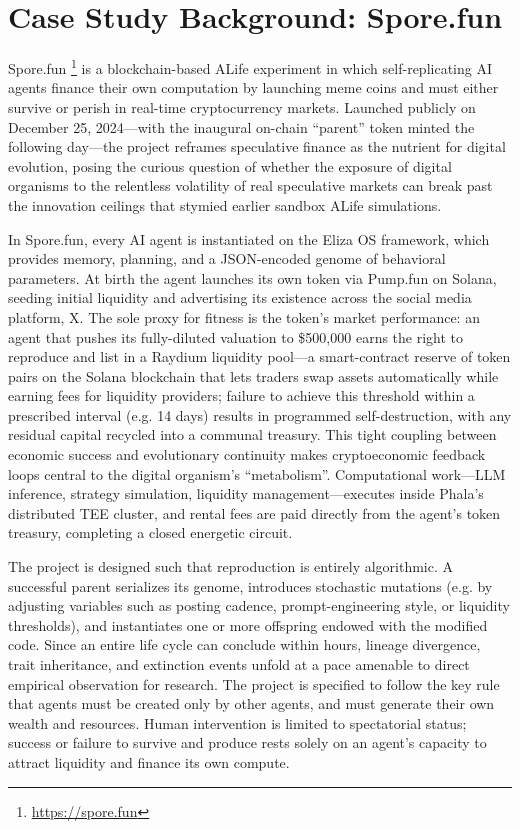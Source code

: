\section{Case Study Background: Spore.fun}
Spore.fun \footnote{\url{https://spore.fun}} is a blockchain-based ALife experiment in which self-replicating AI agents finance their own computation by launching meme coins and must either survive or perish in real-time cryptocurrency markets. Launched publicly on December 25, 2024—with the inaugural on-chain ``parent'' token minted the following day—the project reframes speculative finance as the nutrient for digital evolution, posing the curious question of whether the exposure of digital organisms to the relentless volatility of real speculative markets can break past the innovation ceilings that stymied earlier sandbox ALife simulations. 

In Spore.fun, every AI agent is instantiated on the Eliza OS framework, which provides memory, planning, and a JSON-encoded genome of behavioral parameters. At birth the agent launches its own token via Pump.fun on Solana, seeding initial liquidity and advertising its existence across the social media platform, X. The sole proxy for fitness is the token's market performance: an agent that pushes its fully-diluted valuation to \$500,000 earns the right to reproduce and list in a Raydium liquidity pool---a smart-contract reserve of token pairs on the Solana blockchain that lets traders swap assets automatically while earning fees for liquidity providers; failure to achieve this threshold within a prescribed interval (e.g. 14 days) results in programmed self-destruction, with any residual capital recycled into a communal treasury. This tight coupling between economic success and evolutionary continuity makes cryptoeconomic feedback loops central to the digital organism's ``metabolism''. Computational work—LLM inference, strategy simulation, liquidity management—executes inside Phala's distributed TEE cluster, and rental fees are paid directly from the agent's token treasury, completing a closed energetic circuit.

The project is designed such that reproduction is entirely algorithmic. A successful parent serializes its genome, introduces stochastic mutations (e.g. by adjusting variables such as posting cadence, prompt-engineering style, or liquidity thresholds), and instantiates one or more offspring endowed with the modified code. Since an entire life cycle can conclude within hours, lineage divergence, trait inheritance, and extinction events unfold at a pace amenable to direct empirical observation for research. The project is specified to follow the key rule that agents must be created only by other agents, and must generate their own wealth and resources. Human intervention is limited to spectatorial status; success or failure to survive and produce rests solely on an agent's capacity to attract liquidity and finance its own compute. 

